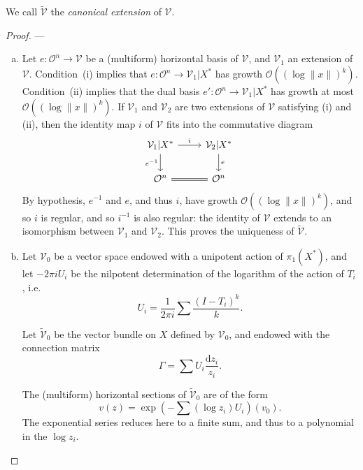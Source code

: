 \documentclass{report}
\renewcommand{\cal}[1]{{\mathcal{#1}}}
\newcommand{\dd}{\mathrm{d}}
\newcommand{\order}{\mathcal{O}}
\newcommand{\oldpage}[1]{\marginpar{\footnotesize$\Big\vert$ \textit{p.~#1}}}
\begin{document}
We call $\widetilde{\cal{V}}$ the \emph{canonical extension} of $\cal{V}$.

\begin{proof}
---
  \begin{enumerate}[(a)]
    \item Let $e\colon\cal{O}^n\to\cal{V}$ be a (multiform) horizontal basis of $\cal{V}$, and $\cal{V}_1$ an extension of $\cal{V}$.
      Condition~(i) implies that $e\colon\cal{O}^n\to\cal{V}_1|X^*$ has growth $\order((\log\|x\|)^k)$.
      Condition~(ii) implies that the dual basis $e'\colon\cal{O}^n\to\cal{V}_1|X^*$ has growth at most $\order((\log\|x\|)^k)$.
      If $\cal{V}_1$ and $\cal{V}_2$ are two extensions of $\cal{V}$ satisfying (i) and (ii), then the identity map $i$ of $\cal{V}$ fits into the commutative diagram
      \[
        \begin{tikzcd}
          \cal{V}_1|X^*
            \rar["i"] \dar[swap,"e^{-1}"]
          & \cal{V}_2|X^*
            \dar["e"]
        \\\cal{O}^n
            \rar[equal]
          & \cal{O}^n
        \end{tikzcd}
      \]
\oldpage{93}
      By hypothesis, $e^{-1}$ and $e$, and thus $i$, have growth $\order((\log\|x\|)^k)$, and so $i$ is regular, and so $i^{-1}$ is also regular:
      the identity of $\cal{V}$ extends to an isomorphism between $\cal{V}_1$ and $\cal{V}_2$.
      This proves the uniqueness of $\widetilde{\cal{V}}$.

    \item Let $\cal{V}_0$ be a vector space endowed with a unipotent action of $\pi_1(X^*)$, and let $-2\pi i U_i$ be the nilpotent determination of the logarithm of the action of $T_i$, i.e.
      \[
      \label{II.5.2.1}
        U_i = \frac{1}{2\pi i}\sum\frac{(I-T_i)^k}{k}.
      \tag{5.2.1}
      \]

      Let $\widetilde{\cal{V}}_0$ be the vector bundle on $X$ defined by $\cal{V}_0$, and endowed with the connection matrix
      \[
      \label{II.5.2.2}
        \Gamma = \sum U_i\frac{\dd z_i}{z_i}.
      \tag{5.2.2}
      \]

      The (multiform) horizontal sections of $\widetilde{\cal{V}}_0$ are of the form
      \[
      \label{II.5.2.3}
        v(z) = \exp\left(-\sum(\log z_i) U_i\right)(v_0).
      \tag{5.2.3}
      \]
      The exponential series reduces here to a finite sum, and thus to a polynomial in the $\log z_i$.


\end{enumerate}
\end{proof}
\end{document}
